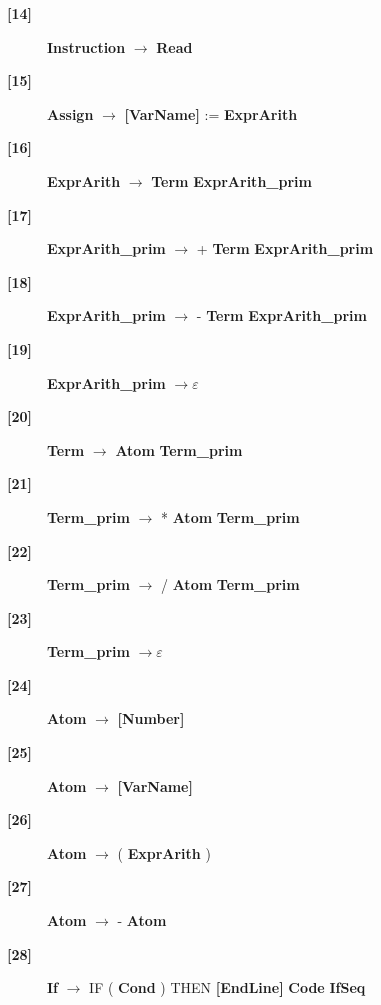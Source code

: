 \documentclass[12pt]{article}
\begin{document}
\begin{description}
\item[\textbf{[14]}]{ \textbf{\textlangle{}Instruction\textrangle{}}  $\rightarrow$ \textbf{\textlangle{}Read\textrangle{}} }
\item[\textbf{[15]}]{ \textbf{\textlangle{}Assign\textrangle{}}  $\rightarrow$ \textbf{[VarName]} := \textbf{\textlangle{}ExprArith\textrangle{}} }
\item[\textbf{[16]}]{ \textbf{\textlangle{}ExprArith\textrangle{}}  $\rightarrow$ \textbf{\textlangle{}Term\textrangle{}}  \textbf{\textlangle{}ExprArith\_prim\textrangle{}} }
\item[\textbf{[17]}]{ \textbf{\textlangle{}ExprArith\_prim\textrangle{}}  $\rightarrow$ + \textbf{\textlangle{}Term\textrangle{}}  \textbf{\textlangle{}ExprArith\_prim\textrangle{}} }
\item[\textbf{[18]}]{ \textbf{\textlangle{}ExprArith\_prim\textrangle{}}  $\rightarrow$ - \textbf{\textlangle{}Term\textrangle{}}  \textbf{\textlangle{}ExprArith\_prim\textrangle{}} }
\item[\textbf{[19]}]{ \textbf{\textlangle{}ExprArith\_prim\textrangle{}}  $\rightarrow \varepsilon$}
\item[\textbf{[20]}]{ \textbf{\textlangle{}Term\textrangle{}}  $\rightarrow$ \textbf{\textlangle{}Atom\textrangle{}}  \textbf{\textlangle{}Term\_prim\textrangle{}} }
\item[\textbf{[21]}]{ \textbf{\textlangle{}Term\_prim\textrangle{}}  $\rightarrow$ * \textbf{\textlangle{}Atom\textrangle{}}  \textbf{\textlangle{}Term\_prim\textrangle{}} }
\item[\textbf{[22]}]{ \textbf{\textlangle{}Term\_prim\textrangle{}}  $\rightarrow$ / \textbf{\textlangle{}Atom\textrangle{}}  \textbf{\textlangle{}Term\_prim\textrangle{}} }
\item[\textbf{[23]}]{ \textbf{\textlangle{}Term\_prim\textrangle{}}  $\rightarrow \varepsilon$}
\item[\textbf{[24]}]{ \textbf{\textlangle{}Atom\textrangle{}}  $\rightarrow$ \textbf{[Number]}}
\item[\textbf{[25]}]{ \textbf{\textlangle{}Atom\textrangle{}}  $\rightarrow$ \textbf{[VarName]}}
\item[\textbf{[26]}]{ \textbf{\textlangle{}Atom\textrangle{}}  $\rightarrow$ ( \textbf{\textlangle{}ExprArith\textrangle{}}  )}
\item[\textbf{[27]}]{ \textbf{\textlangle{}Atom\textrangle{}}  $\rightarrow$ - \textbf{\textlangle{}Atom\textrangle{}} }
\item[\textbf{[28]}]{ \textbf{\textlangle{}If\textrangle{}}  $\rightarrow$ IF ( \textbf{\textlangle{}Cond\textrangle{}}  ) THEN \textbf{[EndLine]} \textbf{\textlangle{}Code\textrangle{}}  \textbf{\textlangle{}IfSeq\textrangle{}} }

\end{description}
\end{document}
